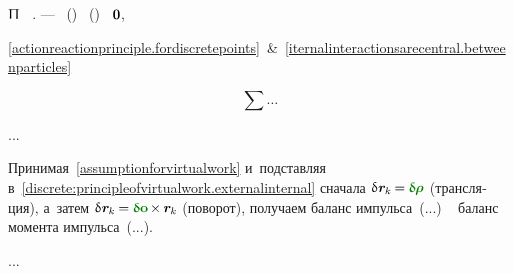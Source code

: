 \vspace{-0.4em}\noindent
{}
$\potentialenergyinmechanics$~
.
%
\:---
~()
%
~()
~${\bm{0}}$\hbox{\hspace{.1ex},}

\eqref{actionreactionprinciple.fordiscretepoints}~\&~\eqref{iternalinteractionsarecentral.betweenparticles}

\begin{equation*}
\sum \ldots
\end{equation*}

...

\begin{otherlanguage}{russian}

Принимая~\eqref{assumptionforvirtualwork}
и~подставляя в~\eqref{discrete:principleofvirtualwork.externalinternal}
сначала ${\variation{\hspace{.1ex}\locationvector_{\hspace{-0.1ex}k}} \hspace{-0.16ex} = \hspace{-0.08ex} \constvarvector{\hspace{-0.1ex}\bm{\rho}}}$
(трансляция),
а~затем ${\variation{\hspace{.1ex}\locationvector_{\hspace{-0.1ex}k}} \hspace{-0.16ex} = \hspace{-0.08ex} \constvarvector{\bm{o}} \hspace{-0.2ex} \times \hspace{-0.1ex} \locationvector_{\hspace{-0.1ex}k}}$
(поворот),
получаем баланс импульса~(...)
~%
баланс момента импульса~(...).

\end{otherlanguage}

...


